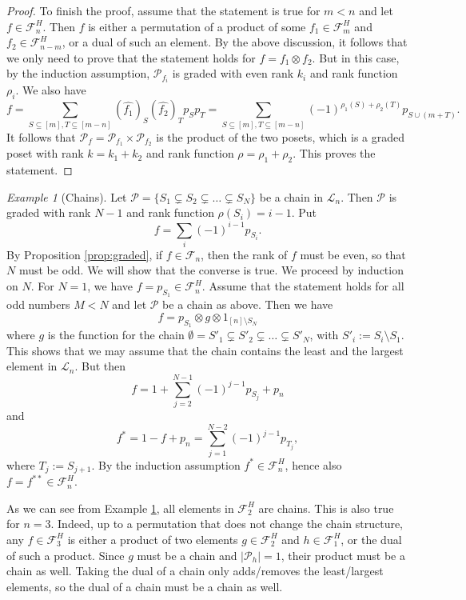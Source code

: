 \documentclass[12pt]{article}
\theoremstyle{definition}
\theoremstyle{remark}
\newtheorem{example}{Example}
\def\Pe{\mathcal P}
\def\Fe{\mathcal F}
\begin{document}
\begin{proof}
To finish the proof, assume that the statement is true for $m<n$ and let $f\in \Fe_n^H$.
Then $f$ is either a permutation of a product of some $f_1\in \Fe_{m}^H$ and $f_2\in \Fe_{n-m}^H$, or a
dual  of such an element. By the above discussion, it follows that we only need to prove
that the statement holds for $f=f_1\otimes f_2$. But in this case, by the induction
assumption, $\Pe_{f_i}$ is graded with even rank $k_i$ and rank function $\rho_i$. We also
have
\[
f=\sum_{S\subseteq [m], T\subseteq [m-n]} (\widehat {f_1})_S(\widehat {f_2})_T p_Sp_T=
\sum_{S\subseteq [m], T\subseteq [m-n]}(-1)^{\rho_1(S)+\rho_2(T)}p_{S\cup(m+T)}.
\]
It follows that $\Pe_f=\Pe_{f_1}\times \Pe_{f_2}$ is the product of the two posets, which
is a graded poset with rank $k=k_1+k_2$ and rank function $\rho=\rho_1+\rho_2$. This
proves the statement. 




\end{proof}




\begin{example}[Chains]\label{ex:chains} Let $\Pe=\{S_1\subsetneq S_2\subsetneq \dots \subsetneq
S_N\}$ be a chain in $\mathcal L_n$. Then  $\Pe$ is graded with rank $N-1$
and rank function $\rho(S_i)=i-1$. Put 
\[
f=\sum_i (-1)^{i-1} p_{S_i}.
\]
By Proposition \ref{prop:graded}, if $f\in \Fe_n$, then the rank of $f$ must be even, so
that $N$ must be odd. 
We will show that the converse is true. We proceed by induction on $N$. For $N=1$, we have
$f=p_{S_1}\in \Fe_n^H$. Assume that the statement holds for all odd numbers $M<N$ and let
$\Pe$ be a chain as above. Then we have 
\[
f=p_{S_1}\otimes g\otimes 1_{[n]\setminus S_N}
\]
where $g$ is the function for the chain $\emptyset=S'_1\subsetneq S'_2\subsetneq \dots
\subsetneq S'_N$, with $S'_i:=S_i\setminus S_1$. This shows that we may assume that the chain
contains the least and the largest element in $\mathcal L_n$. But then 
\[
f=1+\sum_{j=2}^{N-1} (-1)^{j-1}p_{S_j}+ p_n 
\]
and
\[
f^*=1-f+p_n=\sum_{j=1}^{N-2} (-1)^{j-1}p_{T_j},
\]
where $T_j:=S_{j+1}$. By the induction assumption $f^*\in \Fe_n^H$, hence also $f=f^{**}\in \Fe_n^H$.


As we can see from Example \ref{ex:chains}, all elements in $\Fe_2^H$ are chains. This is
also true for $n=3$. Indeed, up to a permutation that does not change the chain structure, 
any $f\in \Fe_3^H$ is either a product of two elements $g\in \Fe_2^H$ and $h\in \Fe_1^H$,
or the dual of such a  product. Since $g$ must be a chain and $|\Pe_h|=1$, their product
must be a chain as well. Taking the dual of a chain only adds/removes the least/largest
elements, so the dual of a chain must be a chain as well.


\end{example}
\end{document}
